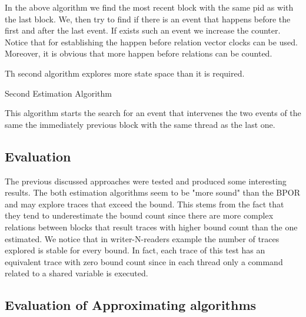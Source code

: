 In the above algorithm we find the most recent block with the same pid as with the last block. We, then try to find if there is an event that happens before the first
and after the last event. If exists such an event we increase the counter.
Notice that for establishing the happen before relation vector clocks can be used.
Moreover, it is obvious that more happen before relations can be counted.


Th second algorithm explores more state space than it is required.\\

\begin{algorithm}[H]
    \caption{Second Estimation Algorithm}
\end{algorithm}

This algorithm starts the search for an event that intervenes the two events of the same the immediately previous block with the same thread as the last one.

\subsection{Evaluation}
The previous discussed approaches were tested and produced some interesting results. The both estimation algorithms seem to be "more sound" than the BPOR and
may explore traces that exceed the bound. This stems from the fact that they tend to underestimate the bound count since there are more complex relations 
between blocks that result traces with higher bound count than the one estimated. We notice that in writer-N-readers example the number of traces explored
is stable for every bound. In fact, each trace of this test has an equivalent trace with zero bound count since in each thread only a command related to
a shared variable is executed.

\subsection{Evaluation of Approximating algorithms}



